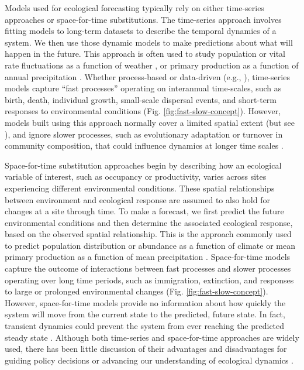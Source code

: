\documentclass[11pt]{article}
\begin{document}
Models used for ecological forecasting typically rely on either time-series approaches or space-for-time substitutions. The time-series approach involves fitting models to long-term datasets to describe the temporal dynamics of a system.  We then use those dynamic models to make predictions about what will happen in the future. This approach is often used to study population or vital rate fluctuations as a function of weather \citep{dalgleish_climate_2011}, or primary production as a function of annual precipitation \citep{lauenroth_long-term_1992}. Whether process-based or data-driven (e.g., \citealt{ward_complexity_2014}), time-series models capture ``fast processes'' operating on interannual time-scales, such as birth, death, individual growth, small-scale dispersal events, and short-term responses to environmental conditions (Fig. \ref{fig:fast-slow-concept}). However, models built using this approach normally cover a limited spatial extent (but see \citealt{Hefley2017,kleinhesselink_response_2018}), and ignore slower processes, such as evolutionary adaptation or turnover in community composition, that could influence dynamics at longer time scales \citep{clark_ecological_2001}. 

Space-for-time substitution approaches begin by describing how an ecological variable of interest, such as occupancy or productivity,  varies across sites experiencing different environmental conditions. These spatial relationships between environment and ecological response are assumed to also hold for changes at a site through time. To make a forecast, we first predict the future environmental conditions and then determine the associated ecological response, based on the observed spatial relationship.  This is the approach commonly used to predict population distribution or abundance as a function of climate \citep{elith_species_2009} or mean primary production as a function of mean precipitation \citep{Sala1988}. Space-for-time models capture the outcome of interactions between fast processes and slower processes operating over long time periods, such as immigration, extinction, and responses to large or prolonged environmental changes (Fig. \ref{fig:fast-slow-concept}). However, space-for-time models provide no information about how quickly the system will move from the current state to the predicted, future state. In fact, transient dynamics could prevent the system from ever reaching the predicted steady state \citep{Urban2012}. Although both time-series and space-for-time approaches are widely used, there has been little discussion of their advantages and disadvantages for guiding policy decisions or advancing our understanding of ecological dynamics \citep{harris_forecasting_2018,Renwick2018}. 
\end{document}
